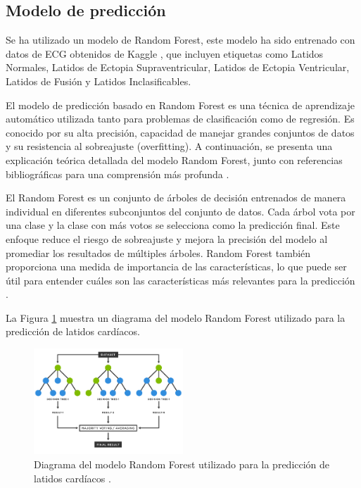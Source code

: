 \subsection{Modelo de predicción}

Se ha utilizado un modelo de Random Forest, este modelo ha sido entrenado con datos de ECG obtenidos de Kaggle \cite{kaggle-data}, que incluyen etiquetas como Latidos Normales, Latidos de Ectopia Supraventricular, Latidos de Ectopia Ventricular, Latidos de Fusión y Latidos Inclasificables.

El modelo de predicción basado en Random Forest es una técnica de aprendizaje automático utilizada tanto para problemas de clasificación como de regresión. Es conocido por su alta precisión, capacidad de manejar grandes conjuntos de datos y su resistencia al sobreajuste (overfitting). A continuación, se presenta una explicación teórica detallada del modelo Random Forest, junto con referencias bibliográficas para una comprensión más profunda \cite{randomforest-medium}.

El Random Forest es un conjunto de árboles de decisión entrenados de manera individual en diferentes subconjuntos del conjunto de datos. Cada árbol vota por una clase y la clase con más votos se selecciona como la predicción final. Este enfoque reduce el riesgo de sobreajuste y mejora la precisión del modelo al promediar los resultados de múltiples árboles. Random Forest también proporciona una medida de importancia de las características, lo que puede ser útil para entender cuáles son las características más relevantes para la predicción \cite{randomforest-medium}.

La Figura \ref{fig:RandomForest} muestra un diagrama del modelo Random Forest utilizado para la predicción de latidos cardíacos.

\begin{figure}[h]
\centering
\includegraphics[width=0.5\textwidth]{img/randomforest.png}
\caption{Diagrama del modelo Random Forest utilizado para la predicción de latidos cardíacos \cite{randomforest-medium}.}
\label{fig:RandomForest}
\end{figure}

